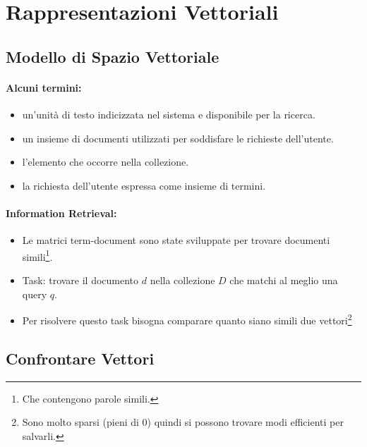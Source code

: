 \section{Rappresentazioni Vettoriali}

\subsection{Modello di Spazio Vettoriale}

\paragraph{Alcuni termini:}

\begin{itemize}
  \item {} un'unità di testo indicizzata nel sistema e disponibile per la ricerca. 
  \item {} un insieme di documenti utilizzati per soddisfare le richieste dell'utente. 
  \item {} l'elemento che occorre nella collezione. 
  \item {} la richiesta dell'utente espressa come insieme di termini. 
\end{itemize}


\paragraph{Information Retrieval:}

\begin{itemize}
  \item Le matrici term-document sono state sviluppate per trovare documenti simili\footnote{Che contengono parole simili.}. 
  \item Task: trovare il documento $d$ nella collezione $D$ che matchi al meglio una query $q$. 
  \item Per risolvere questo task bisogna comparare quanto siano simili due vettori\footnote{Sono molto sparsi (pieni di 0) quindi si possono trovare modi efficienti per salvarli.}
\end{itemize}

\subsection{Confrontare Vettori}

